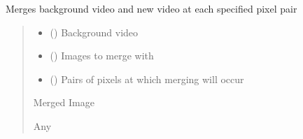 \documentclass[letterpaper,10pt,english]{sphinxmanual}
\begin{document}
\begin{fulllineitems}
\label{\detokenize{Coloring:Coloring.merge_background}}
\pysigstartsignatures
{}
\pysigstopsignatures
\sphinxAtStartPar
Merges background video and new video at each specified pixel pair
\begin{quote}\begin{description}
\begin{itemize}
\item {} 
\sphinxAtStartPar
{} () \textendash{} Background video

\item {} 
\sphinxAtStartPar
{} () \textendash{} Images to merge with

\item {} 
\sphinxAtStartPar
{} (\sphinxstyleliteralemphasis{\sphinxupquote{{[}}}\sphinxstyleliteralemphasis{\sphinxupquote{{[}}}\sphinxstyleliteralemphasis{\sphinxupquote{,}}\sphinxstyleliteralemphasis{\sphinxupquote{{]}}}\sphinxstyleliteralemphasis{\sphinxupquote{{]}}}) \textendash{} Pairs of pixels at which merging will occur

\end{itemize}

\sphinxAtStartPar
Merged Image

\sphinxAtStartPar
Any

\end{description}\end{quote}

\end{fulllineitems}
\end{document}
